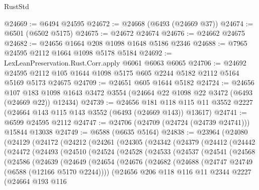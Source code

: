 \begin{lexlean}{RustStd}
\begin{coremodule}
@24669 := @6494 @24595
@24672 := @24668 (@6493 (@24669 @37))
@24674 := @6501 (@6502 @5175)
@24675 := @24672 @24674
@24676 := @24662 @24675
@24682 := @24656 @1664 @208 @1098 @1648 @5186 @2346
@24688 := @7965 @24595 @2112 @1664 @1098 @5178 @5184
@24692 := LexLeanPreservation.Rust.Corr.apply @6061 @6063 @6065
@24706 := @24692 @24595 @2112 @105 @1644 @1098 @5175 @605 @2244 @5182 @2112 @5164 @5169 @5173 @24675
@24709 := @24651 @605 @1644 @5182
@24724 := @24656
    @107
    @183
    @1098
    @1643
    @3472
    @3554
    (@24664 @22 @1098 @22 @3472 (@6493 (@24669 @22)) @12434)
@24739 := @24656
    @181
    @118
    @115
    @11
    @3552
    @2227
    (@24664 @143 @115 @143 @3552 (@6493 (@24669 @143)) @13617)
@24741 := @6599 @24595 @2112
@24747 := @24706 (@24709 (@24724 (@24739 @24741))) @15844 @13038
@24749 := @6588 (@6635 @5164)
@24838 := @23964
    (@24080
      (@24129
        (@24172
          (@24212
            (@24261
              (@24305
                (@24342
                  (@24379
                    (@24412
                      (@24442
                        (@24472
                          (@24493
                            (@24510
                              (@24524
                                (@24528
                                  (@24533
                                    (@24537
                                      (@24541
                                        (@24568
                                          (@24586
                                            (@24639
                                              (@24649
                                                (@24654
                                                  (@24676
                                                    (@24682
                                                      (@24688
                                                        (@24747
                                                          @24749
                                                          (@6588 (@12166 @5170 @2244))))
                                                      (@24656
                                                        @206
                                                        @118
                                                        @116
                                                        @11
                                                        @2344
                                                        @2227
                                                        (@24664
                                                          @193
                                                          @116

\end{coremodule}
\end{lexlean}
